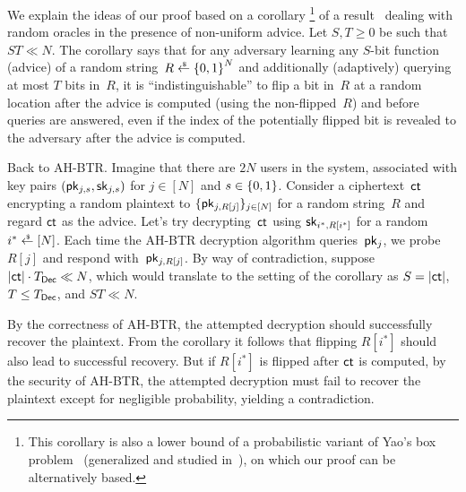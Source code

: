 We explain the ideas of our proof based on a corollary%
\footnote{This corollary is also a lower bound of a probabilistic variant of Yao's box problem~\cite{STOC:Yao90} (generalized and studied in~\cite{EC:CorHenKog22}), on which our proof can be alternatively based.
}
of a result~\cite{C:Unruh07} dealing with random oracles in the presence of non-uniform advice.
Let ${S,T\geq 0}$ be such that ${ST\ll N}$.
The corollary says that
for any adversary learning any $S$-bit function (advice) of a random string~${R\draws\bit^N}$ and additionally (adaptively) querying at most $T$ bits in~$R$,
it is ``indistinguishable'' to flip a bit in~$R$ at a random location
after the advice is computed (using the non-flipped~$R$) and
before queries are answered,
even if the index of the potentially flipped bit is revealed to the adversary after the advice is computed.

Back to AH-BTR. Imagine that there are $2N$ users in the system, associated with key pairs $(\pk_{j,s},\sk_{j,s})$ for ${j\in[N]}$ and ${s\in{\{0,1\}}}$.
Consider a ciphertext~$\ct$ encrypting a random plaintext to $\{\pk_{j,R[j]}\}_{j\in[N]}$ for a random string~$R$ and
regard $\ct$ as the advice.
Let's try decrypting~$\ct$ using $\sk_{i^\ast,R[i^\ast]}$ for a random ${i^\ast\draws[N]}$.
Each time the AH-BTR decryption algorithm queries~$\pk_j$,
we probe $R[j]$ and respond with~$\pk_{j,R[j]}$.
By way of contradiction, suppose ${|\ct|\cdot T_\Dec\ll N}$,
which would translate to the setting of the corollary as ${S=|\ct|}$, ${T\leq T_\Dec}$, and ${ST\ll N}$.

By the correctness of AH-BTR,
the attempted decryption should successfully recover the plaintext.
From the corollary it follows that flipping $R[i^\ast]$ should also lead to successful recovery.
But if $R[i^\ast]$ is flipped after $\ct$ is computed,
by the security of AH-BTR,
the attempted decryption must fail to recover the plaintext except for negligible probability, yielding a contradiction.
